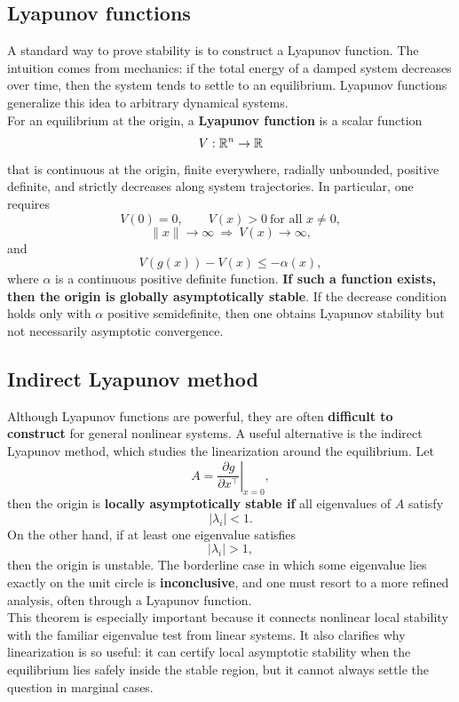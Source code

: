 \subsection{Lyapunov functions}

A standard way to prove stability is to construct a Lyapunov function. The intuition comes from mechanics: if the total energy of a damped system decreases over time, then the system tends to settle to an equilibrium. Lyapunov functions generalize this idea to arbitrary dynamical systems.\\
For an equilibrium at the origin, a \textbf{Lyapunov function} is a scalar function
\[
V:\mathbb{R}^n\to\mathbb{R}
\]
that is continuous at the origin, finite everywhere, radially unbounded, positive definite, and strictly decreases along system trajectories. In particular, one requires
\[
V(0)=0, \qquad V(x)>0 \ \text{for all } x\neq 0,
\]
\[
\|x\|\to\infty \ \Longrightarrow\ V(x)\to\infty,
\]
and
\[
V(g(x))-V(x)\le -\alpha(x),
\]
where $\alpha$ is a continuous positive definite function. \textbf{If such a function exists, then the origin is globally asymptotically stable}. If the decrease condition holds only with $\alpha$ positive semidefinite, then one obtains Lyapunov stability but not necessarily asymptotic convergence.

\subsection{Indirect Lyapunov method}

Although Lyapunov functions are powerful, they are often \textbf{difficult to construct} for general nonlinear systems. A useful alternative is the indirect Lyapunov method, which studies the linearization around the equilibrium. Let
\[
A = \left.\frac{\partial g}{\partial x^\top}\right|_{x=0},
\]
then the origin is \textbf{locally asymptotically stable if} all eigenvalues of $A$ satisfy
\[
|\lambda_i|<1.
\]
On the other hand, if at least one eigenvalue satisfies
\[
|\lambda_i|>1,
\]
then the origin is unstable. The borderline case in which some eigenvalue lies exactly on the unit circle is \textbf{inconclusive}, and one must resort to a more refined analysis, often through a Lyapunov function.\\

This theorem is especially important because it connects nonlinear local stability with the familiar eigenvalue test from linear systems. It also clarifies why linearization is so useful: it can certify local asymptotic stability when the equilibrium lies safely inside the stable region, but it cannot always settle the question in marginal cases.

